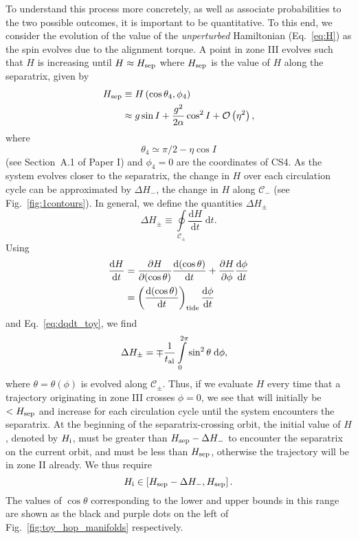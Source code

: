 \documentclass[
        fleqn,
        usenatbib,
        referee
    ]{mnras}
\newcommand*{\rd}[2]{\frac{\mathrm{d}#1}{\mathrm{d}#2}}
\newcommand*{\pd}[2]{\frac{\partial#1}{\partial#2}}
\newcommand*{\p}[1]{\left(#1\right)}
\newcommand*{\s}[1]{\left[#1\right]}
\begin{document}
To understand this process more concretely, as well as associate probabilities
to the two possible outcomes, it is important to be quantitative. To this end,
we consider the evolution of the value of the \emph{unperturbed} Hamiltonian
(Eq.~\ref{eq:H}) as the spin evolves due to the alignment torque. A point in
zone III evolves such that $H$ is increasing until $H \approx H_{\rm sep}$ where
$H_{\rm sep}$ is the value of $H$ along the separatrix, given by
\begin{align}
    H_{\rm sep} &\equiv H\p{\cos \theta_{\rm 4}, \phi_{\rm 4}}\nonumber\\
        &\approx g\sin I + \frac{g^2}{2\alpha}\cos^2 I +
            \mathcal{O}\p{\eta^2},\label{eq:def_Hsep}
\end{align}
where
\begin{equation}
    \theta_4 \simeq \pi/2 - \eta \cos I
\end{equation}
(see Section~A.1 of Paper I) and $\phi_4 = 0$ are the coordinates of CS4. As the
system evolves closer to the separatrix, the change in $H$ over each circulation
cycle can be approximated by $\Delta H_-$, the change in $H$ along
$\mathcal{C}_-$ (see Fig.~\ref{fig:1contours}). In general, we define the
quantities $\Delta H_{\pm}$
\begin{equation}
    \Delta H_{\pm} \equiv \oint\limits_{\mathcal{C}_{\pm}}
        \rd{H}{t}\;\mathrm{d}t.\label{eq:def_dHpm}
\end{equation}
Using
\begin{align}
    \rd{H}{t} &=
            \pd{H}{(\cos \theta)}\rd{(\cos \theta)}{t}
            + \pd{H}{\phi}\rd{\phi}{t}\nonumber\\
        &= \p{\rd{(\cos\theta)}{t}}_{\rm tide} \rd{\phi}{t}
\end{align}
and Eq.~\eqref{eq:dqdt_toy}, we find
\begin{align}
    \Delta H_{\pm} &= \mp\frac{1}{t_{\rm al}}
        \int\limits_0^{2\pi} \sin^2\theta\;\mathrm{d}\phi,
        \label{eq:deltaH_pm_toy}
\end{align}
where $\theta = \theta\p{\phi}$ is evolved along $\mathcal{C}_{\pm}$. Thus, if
we evaluate $H$ every time that a trajectory originating in zone III crosses
$\phi = 0$, we see that will initially be $< H_{\rm sep}$ and increase for
each circulation cycle until the system encounters the separatrix. At the
beginning of the separatrix-crossing orbit, the initial value of $H$, denoted
by $H_{\rm i}$, must be greater than $H_{\rm sep} - \Delta H_-$ to encounter the
separatrix on the current orbit, and must be less than $H_{\rm sep}$, otherwise
the trajectory will be in zone II already. We thus require
\begin{equation}
    H_{\rm i} \in \s{ H_{\rm sep} - \Delta H_-,  H_{\rm sep}}
        \label{eq:Hi_range}.
\end{equation}
The values of $\cos \theta$ corresponding to the lower and upper bounds in this
range are shown as the black and purple dots on the left of
Fig.~\ref{fig:toy_hop_manifolds} respectively.
\end{document}
